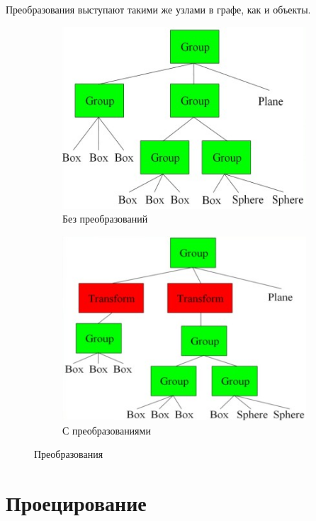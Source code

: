 \documentclass[a4paper, 14pt]{extarticle}
\begin{document}
Преобразования выступают такими же узлами в графе, как и объекты.
\begin{figure}[h]
	\centering
	\begin{subfigure}[b]{0.45\textwidth}
		\centering
		\includegraphics[width=\textwidth]{l4/S021.jpg}
		\caption{Без преобразований}
	\end{subfigure}
	\begin{subfigure}[b]{0.45\textwidth}
		\centering
		\includegraphics[width=\textwidth]{l4/S022.jpg}
		\caption{С преобразованиями}
	\end{subfigure}
	\caption{Преобразования}
\end{figure}

\section{Проецирование}
\end{document}
